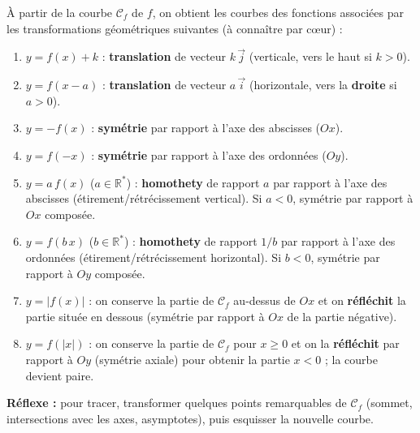 \documentclass[11pt]{article}
\begin{document}
\begin{methode}
À partir de la courbe $\mathcal{C}_f$ de $f$, on obtient les courbes des fonctions associées par les transformations géométriques suivantes (à connaître par cœur) :
\begin{enumerate}
\item $y = f(x) + k$ : \textbf{translation} de vecteur $k\,\vec{j}$ (verticale, vers le haut si $k>0$).
\item $y = f(x - a)$ : \textbf{translation} de vecteur $a\,\vec{i}$ (horizontale, vers la \textbf{droite} si $a>0$).
\item $y = -f(x)$ : \textbf{symétrie} par rapport à l'axe des abscisses ($Ox$).
\item $y = f(-x)$ : \textbf{symétrie} par rapport à l'axe des ordonnées ($Oy$).
\item $y = a\,f(x)$ ($a \in \mathbb{R}^*$) : \textbf{homothety} de rapport $a$ par rapport à l'axe des abscisses (étirement/rétrécissement vertical). Si $a<0$, symétrie par rapport à $Ox$ composée.
\item $y = f(b\,x)$ ($b \in \mathbb{R}^*$) : \textbf{homothety} de rapport $1/b$ par rapport à l'axe des ordonnées (étirement/rétrécissement horizontal). Si $b<0$, symétrie par rapport à $Oy$ composée.
\item $y = |f(x)|$ : on conserve la partie de $\mathcal{C}_f$ au-dessus de $Ox$ et on \textbf{réfléchit} la partie située en dessous (symétrie par rapport à $Ox$ de la partie négative).
\item $y = f(|x|)$ : on conserve la partie de $\mathcal{C}_f$ pour $x \geq 0$ et on la \textbf{réfléchit} par rapport à $Oy$ (symétrie axiale) pour obtenir la partie $x < 0$ ; la courbe devient paire.
\end{enumerate}
\textbf{Réflexe :} pour tracer, transformer quelques points remarquables de $\mathcal{C}_f$ (sommet, intersections avec les axes, asymptotes), puis esquisser la nouvelle courbe.
\end{methode}
\end{document}
